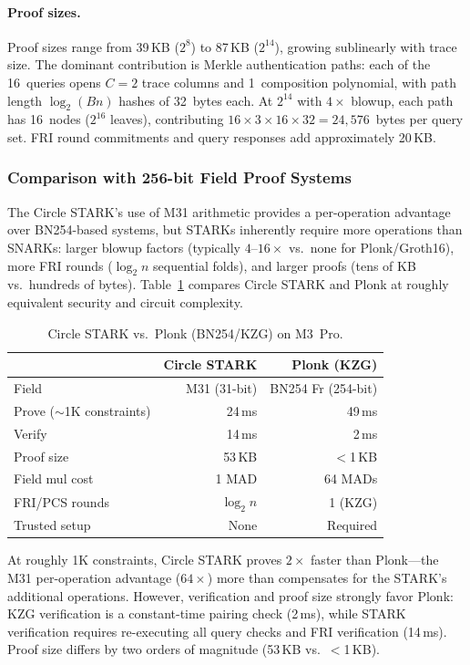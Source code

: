 \paragraph{Proof sizes.}
Proof sizes range from 39\,KB ($2^8$) to 87\,KB ($2^{14}$), growing
sublinearly with trace size.  The dominant contribution is Merkle
authentication paths: each of the 16~queries opens $C = 2$ trace columns
and 1~composition polynomial, with path length $\log_2(Bn)$ hashes of
32~bytes each.  At $2^{14}$ with $4\times$ blowup, each path has 16~nodes
($2^{16}$ leaves), contributing $16 \times 3 \times 16 \times 32 =
24{,}576$~bytes per query set.  FRI round commitments and query
responses add approximately 20\,KB.

\subsubsection{Comparison with 256-bit Field Proof Systems}
\label{sec:circle-vs-plonk}

The Circle STARK's use of M31 arithmetic provides a per-operation
advantage over BN254-based systems, but STARKs inherently require more
operations than SNARKs: larger blowup factors (typically $4$--$16\times$
vs.\ none for Plonk/Groth16), more FRI rounds ($\log_2 n$ sequential
folds), and larger proofs (tens of KB vs.\ hundreds of bytes).
Table~\ref{tab:circle-vs-plonk} compares Circle STARK and Plonk at
roughly equivalent security and circuit complexity.

\begin{table}[t]
\centering
\small
\caption{Circle STARK vs.\ Plonk (BN254/KZG) on M3~Pro.}
\label{tab:circle-vs-plonk}
\begin{tabular}{lrr}
\toprule
 & Circle STARK & Plonk (KZG) \\
\midrule
Field & M31 (31-bit) & BN254 Fr (254-bit) \\
Prove (${\sim}$1K constraints) & 24\,ms & 49\,ms \\
Verify & 14\,ms & 2\,ms \\
Proof size & 53\,KB & $<$1\,KB \\
Field mul cost & 1 MAD & 64 MADs \\
FRI/PCS rounds & $\log_2 n$ & 1 (KZG) \\
Trusted setup & None & Required \\
\bottomrule
\end{tabular}
\end{table}

At roughly 1K constraints, Circle STARK proves $2\times$ faster than
Plonk---the M31 per-operation advantage ($64\times$) more than compensates
for the STARK's additional operations.  However, verification and proof
size strongly favor Plonk: KZG verification is a constant-time pairing
check (2\,ms), while STARK verification requires re-executing all query
checks and FRI verification (14\,ms).  Proof size differs by two orders of
magnitude (53\,KB vs.\ $<$1\,KB).

